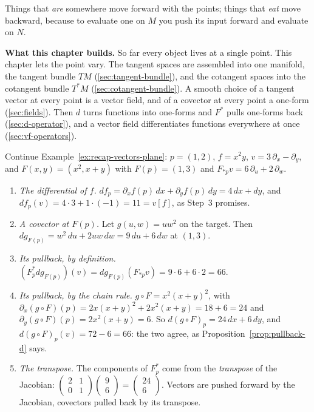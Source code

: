 \documentclass[11pt]{report}
\makeatletter
\newcounter{excounter}[section]
\newcommand{\exlabel}[1]{\edef\@currentlabel{\arabic{section}.\arabic{excounter}}\label{#1}}
\makeatother
\begin{document}
Things that \emph{are} somewhere move forward with the points; things that \emph{eat} move backward, because to evaluate one on $M$ you push its input forward and evaluate on $N$.

\textbf{What this chapter builds.} So far every object lives at a single point. This chapter lets the point vary. The tangent spaces are assembled into one manifold, the tangent bundle $TM$ (\ref{sec:tangent-bundle}), and the cotangent spaces into the cotangent bundle $T^*M$ (\ref{sec:cotangent-bundle}). A smooth choice of a tangent vector at every point is a vector field, and of a covector at every point a one-form (\ref{sec:fields}). Then $d$ turns functions into one-forms and $F^*$ pulls one-forms back (\ref{sec:d-operator}), and a vector field differentiates functions everywhere at once (\ref{sec:vf-operators}).

\begin{exbox}\exlabel{ex:recap-covectors-plane}
Continue Example~\ref{ex:recap-vectors-plane}: $p = (1, 2)$, $f = x^2 y$, $v = 3\,\partial_x - \partial_y$, and $F(x, y) = (x^2, x + y)$ with $F(p) = (1, 3)$ and $F_{*p}v = 6\,\partial_u + 2\,\partial_w$.
\begin{enumerate}
    \item \emph{The differential of $f$.} $df_p = \partial_x f(p)\, dx + \partial_y f(p)\, dy = 4\, dx + dy$, and $df_p(v) = 4 \cdot 3 + 1 \cdot (-1) = 11 = v[f]$, as Step~3 promises.
    \item \emph{A covector at $F(p)$.} Let $g(u, w) = u w^2$ on the target. Then $dg_{F(p)} = w^2\, du + 2uw\, dw = 9\, du + 6\, dw$ at $(1, 3)$.
    \item \emph{Its pullback, by definition.} $(F_p^* dg_{F(p)})(v) = dg_{F(p)}(F_{*p}v) = 9 \cdot 6 + 6 \cdot 2 = 66$.
    \item \emph{Its pullback, by the chain rule.} $g \circ F = x^2 (x + y)^2$, with $\partial_x (g \circ F)(p) = 2x(x+y)^2 + 2x^2(x+y) = 18 + 6 = 24$ and $\partial_y (g \circ F)(p) = 2x^2(x+y) = 6$. So $d(g \circ F)_p = 24\, dx + 6\, dy$, and $d(g \circ F)_p(v) = 72 - 6 = 66$: the two agree, as Proposition~\ref{prop:pullback-d} says.
    \item \emph{The transpose.} The components of $F_p^*$ come from the \emph{transpose} of the Jacobian: $\begin{pmatrix} 2 & 1 \\ 0 & 1 \end{pmatrix} \begin{pmatrix} 9 \\ 6 \end{pmatrix} = \begin{pmatrix} 24 \\ 6 \end{pmatrix}$. Vectors are pushed forward by the Jacobian, covectors pulled back by its transpose.
\end{enumerate}
\end{exbox}
\end{document}
